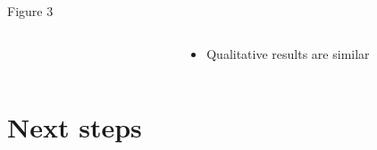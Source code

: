\documentclass[9pt,aspectratio=169]{beamer}
\begin{document}
\begin{frame}{Figure 3}
\begin{columns}
	\begin{column}{0.5\linewidth}
		\begin{figure}
		\end{figure}
		
	\end{column}
	\begin{column}{0.5\linewidth}
		\begin{itemize}
			\item Qualitative results are similar
		\end{itemize}
	\end{column}
\end{columns}
\end{frame}

\section{Next steps}
\end{document}
